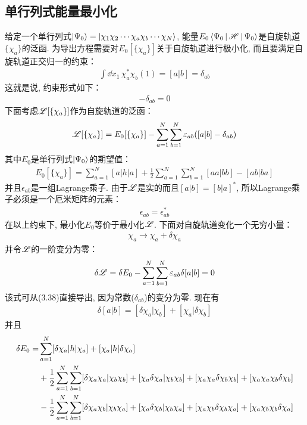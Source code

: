 \subsection{单行列式能量最小化}
给定一个单行列式$\Ket{\Psi_0} = \Ket{\chi_1\chi_2\cdots\chi_a\chi_b\cdots\chi_N}$, 能量$E_0\Braket{\Psi_0|\mathscr{H}|\Psi_0}$是自旋轨道$\{\chi_a\}$的泛函. 为导出\hft 方程需要对$E_0[\{\chi_a \}]$关于自旋轨道进行极小化, 而且要满足自旋轨道正交归一的约束：
\begin{align}
\int\dd{x}_1\,\chi_a^*\chi_b(1) = [a|b] = \delta_{ab}
\end{align}
这就是说, 约束形式如下：
\begin{align}
[a|b] - \delta_{ab} = 0
\end{align}
下面考虑$\mathscr{L}[\{\chi_a \}]$作为自旋轨道的泛函：
\begin{align}
\mathscr{L}[\{\chi_a \}] = E_0[\{\chi_a\}] - \sum_{a=1}^{N}\sum_{b=1}^{N}\varepsilon_{ab}([a|b]-\delta_{ab})
\end{align}
其中$E_0$是单行列式$\Ket{\Psi_0}$的期望值：
\begin{align}
E_0[\{\chi_a\}] = \sum_{a=1}^{N}[a|h|a] + \frac{1}{2}\sum_{a=1}^{N}\sum_{b=1}^{N}[aa|bb]- [ab|ba]
\end{align}
并且$\epsilon_{ab}$是一组Lagrange乘子. 由于$\mathscr{L}$是实的而且$[a|b]=[b|a]^*$, 所以Lagrange乘子必须是一个厄米矩阵的元素：
\begin{align}
\label{3.40}
\epsilon_{ab} = \epsilon_{ab}^*
\end{align}
在以上约束下, 最小化$E_0$等价于最小化$\mathscr{L}$. 下面对自旋轨道变化一个无穷小量：
\begin{align}
\chi_a \to \chi_a+\delta\chi_a
\end{align}
并令$\mathscr{L}$的一阶变分为零：
\begin{align}
\delta\mathscr{L} = \delta E_0 - \sum_{a=1}^{N}\sum_{b=1}^{N}\varepsilon_{ab}\delta[a|b] = 0
\end{align}
该式可从(3.38)直接导出, 因为常数($\delta_{ab}$)的变分为零. 现在有
\begin{align}
\delta[a|b] = [\delta\chi_a|\chi_b] + [\chi_a|\delta\chi_b]
\end{align}
并且
\begin{align}
\delta E_0 = & \sum_{a=1}^{N}[\delta\chi_a|h|\chi_a] + [\chi_a|h|\delta\chi_a]\notag\\
           & + \frac{1}{2}\sum_{a=1}^{N}\sum_{b=1}^{N}[\delta\chi_a\chi_a|\chi_b\chi_b] + [\chi_a\delta\chi_a|\chi_b\chi_b] + [\chi_a\chi_a\delta\chi_b\chi_b] + [\chi_a\chi_a\chi_b\delta\chi_b]\notag\\
           & - \frac{1}{2}\sum_{a=1}^{N}\sum_{b=1}^{N}[\delta\chi_a\chi_b|\chi_b\chi_a] + [\chi_a\delta\chi_b|\chi_b\chi_a] + [\chi_a\chi_b\delta\chi_b\chi_a] + [\chi_a\chi_b\chi_b\delta\chi_a]
\end{align}
